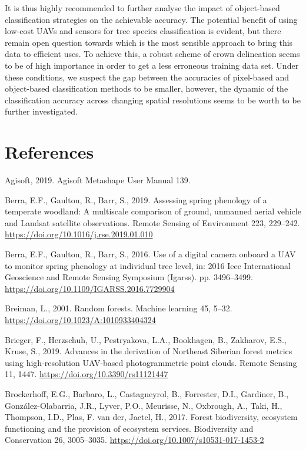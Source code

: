 \documentclass[]{article}
\begin{document}
It is thus highly recommended to further analyse the impact of
object-based classification strategies on the achievable accuracy. The
potential benefit of using low-cost UAVs and sensors for tree species
classification is evident, but there remain open question towards which
is the most sensible approach to bring this data to efficient uses. To
achieve this, a robust scheme of crown delineation seems to be of high
importance in order to get a less erroneous training data set. Under
these conditions, we suspect the gap between the accuracies of
pixel-based and object-based classification methods to be smaller,
however, the dynamic of the classification accuracy across changing
spatial resolutions seems to be worth to be further investigated.

\hypertarget{references}{%
\section*{References}\label{references}}

\hypertarget{refs}{}
\leavevmode\hypertarget{ref-Agisoft2019}{}%
Agisoft, 2019. Agisoft Metashape User Manual 139.

\leavevmode\hypertarget{ref-Berra2019}{}%
Berra, E.F., Gaulton, R., Barr, S., 2019. Assessing spring phenology of
a temperate woodland: A multiscale comparison of ground, unmanned aerial
vehicle and Landsat satellite observations. Remote Sensing of
Environment 223, 229--242.
\url{https://doi.org/10.1016/j.rse.2019.01.010}

\leavevmode\hypertarget{ref-Berra2016}{}%
Berra, E.F., Gaulton, R., Barr, S., 2016. Use of a digital camera
onboard a UAV to monitor spring phenology at individual tree level, in:
2016 Ieee International Geoscience and Remote Sensing Symposium
(Igarss). pp. 3496--3499.
\url{https://doi.org/10.1109/IGARSS.2016.7729904}

\leavevmode\hypertarget{ref-Breiman2001}{}%
Breiman, L., 2001. Random forests. Machine learning 45, 5--32.
\url{https://doi.org/10.1023/A:1010933404324}

\leavevmode\hypertarget{ref-Brieger2019a}{}%
Brieger, F., Herzschuh, U., Pestryakova, L.A., Bookhagen, B., Zakharov,
E.S., Kruse, S., 2019. Advances in the derivation of Northeast Siberian
forest metrics using high-resolution UAV-based photogrammetric point
clouds. Remote Sensing 11, 1447.
\url{https://doi.org/10.3390/rs11121447}

\leavevmode\hypertarget{ref-Brockerhoff2017}{}%
Brockerhoff, E.G., Barbaro, L., Castagneyrol, B., Forrester, D.I.,
Gardiner, B., González-Olabarria, J.R., Lyver, P.O., Meurisse, N.,
Oxbrough, A., Taki, H., Thompson, I.D., Plas, F. van der, Jactel, H.,
2017. Forest biodiversity, ecosystem functioning and the provision of
ecosystem services. Biodiversity and Conservation 26, 3005--3035.
\url{https://doi.org/10.1007/s10531-017-1453-2}
\end{document}
